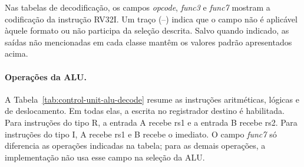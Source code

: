 Nas tabelas de decodificação, os campos \textit{opcode}, \textit{func3} e \textit{func7} mostram a codificação da instrução RV32I. Um traço (--) indica que o campo não é aplicável àquele formato ou não participa da seleção descrita. Salvo quando indicado, as saídas não mencionadas em cada classe mantêm os valores padrão apresentados acima.

\paragraph{Operações da ALU.}
A Tabela~\ref{tab:control-unit-alu-decode} resume as instruções aritméticas, lógicas e de deslocamento. Em todas elas, a escrita no registrador destino é habilitada. Para instruções do tipo R, a entrada A recebe rs1 e a entrada B recebe rs2. Para instruções do tipo I, A recebe rs1 e B recebe o imediato. O campo \textit{func7} só diferencia as operações indicadas na tabela; para as demais operações, a implementação não usa esse campo na seleção da ALU.

